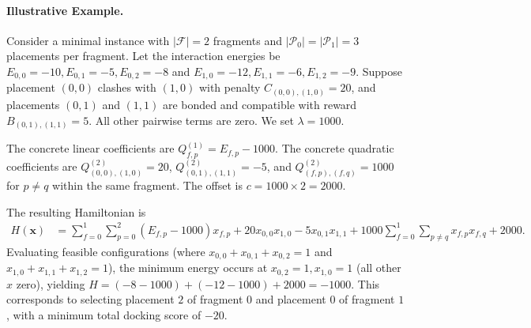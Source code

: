 \documentclass[12pt]{article}
\begin{document}
\paragraph{Illustrative Example.}
Consider a minimal instance with $|\mathcal{F}| = 2$ fragments and $|\mathcal{P}_0| = |\mathcal{P}_1| = 3$ placements per fragment. Let the interaction energies be $E_{0,0}=-10, E_{0,1}=-5, E_{0,2}=-8$ and $E_{1,0}=-12, E_{1,1}=-6, E_{1,2}=-9$. Suppose placement $(0,0)$ clashes with $(1,0)$ with penalty $C_{(0,0),(1,0)} = 20$, and placements $(0,1)$ and $(1,1)$ are bonded and compatible with reward $B_{(0,1),(1,1)} = 5$. All other pairwise terms are zero. We set $\lambda = 1000$.

The concrete linear coefficients are $Q_{f,p}^{(1)} = E_{f,p} - 1000$. The concrete quadratic coefficients are $Q_{(0,0),(1,0)}^{(2)} = 20$, $Q_{(0,1),(1,1)}^{(2)} = -5$, and $Q_{(f,p),(f,q)}^{(2)} = 1000$ for $p \neq q$ within the same fragment. The offset is $c = 1000 \times 2 = 2000$.

The resulting Hamiltonian is
\begin{align}
H(\mathbf{x}) &= \sum_{f=0}^{1} \sum_{p=0}^{2} (E_{f,p} - 1000) x_{f,p} 
+ 20 x_{0,0} x_{1,0} - 5 x_{0,1} x_{1,1} 
+ 1000 \sum_{f=0}^{1} \sum_{p \neq q} x_{f,p} x_{f,q} + 2000.
\end{align}
Evaluating feasible configurations (where $x_{0,0}+x_{0,1}+x_{0,2}=1$ and $x_{1,0}+x_{1,1}+x_{1,2}=1$), the minimum energy occurs at $x_{0,2}=1, x_{1,0}=1$ (all other $x$ zero), yielding $H = (-8-1000) + (-12-1000) + 2000 = -1000$. This corresponds to selecting placement $2$ of fragment $0$ and placement $0$ of fragment $1$, with a minimum total docking score of $-20$.
\end{document}
